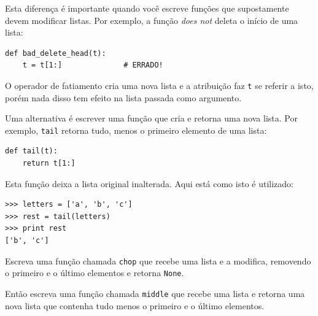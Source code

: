 Esta diferença é importante quando você escreve funções que supostamente devem modificar listas.
Por exemplo, a função \emph{does not} deleta o início de uma lista:


\beforeverb
\begin{verbatim}
def bad_delete_head(t):
    t = t[1:]              # ERRADO!
\end{verbatim}
\afterverb

O operador de fatiamento cria uma nova lista e a atribuição faz {\tt t} se referir a isto,
porém nada disso tem efeito na lista passada como argumento.







Uma alternativa é escrever uma função que cria e retorna uma nova lista.
Por exemplo, {\tt tail} retorna tudo, menos o primeiro elemento de uma lista: 


\beforeverb
\begin{verbatim}
def tail(t):
    return t[1:]
\end{verbatim}
\afterverb
%
Esta função deixa a lista original inalterada.
Aqui está como isto é utilizado:


\beforeverb
\begin{verbatim}
>>> letters = ['a', 'b', 'c']
>>> rest = tail(letters)
>>> print rest
['b', 'c']
\end{verbatim}
\afterverb


\begin{ex}

Escreva uma função chamada {\tt chop} que recebe uma lista e a modifica,
removendo o primeiro e o último elementos e retorna {\tt None}.

Então escreva uma função chamada {\tt middle} que recebe uma lista e retorna
uma nova lista que contenha tudo menos o primeiro e o último elementos.



\end{ex}


